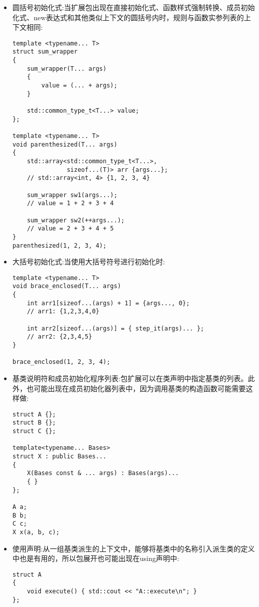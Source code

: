 \begin{itemize}
\item
圆括号初始化式:当扩展包出现在直接初始化式、函数样式强制转换、成员初始化式、new表达式和其他类似上下文的圆括号内时，规则与函数实参列表的上下文相同:

\begin{lstlisting}[style=styleCXX]
template <typename... T>
struct sum_wrapper
{
	sum_wrapper(T... args)
	{
		value = (... + args);
	}

	std::common_type_t<T...> value;
};

template <typename... T>
void parenthesized(T... args)
{
	std::array<std::common_type_t<T...>,
	           sizeof...(T)> arr {args...};
	// std::array<int, 4> {1, 2, 3, 4}
	
	sum_wrapper sw1(args...);
	// value = 1 + 2 + 3 + 4
	
	sum_wrapper sw2(++args...);
	// value = 2 + 3 + 4 + 5
}
parenthesized(1, 2, 3, 4);
\end{lstlisting}

\item
大括号初始化式:当使用大括号符号进行初始化时:

\begin{lstlisting}[style=styleCXX]
template <typename... T>
void brace_enclosed(T... args)
{
	int arr1[sizeof...(args) + 1] = {args..., 0};
	// arr1: {1,2,3,4,0}
	
	int arr2[sizeof...(args)] = { step_it(args)... };
	// arr2: {2,3,4,5}
}

brace_enclosed(1, 2, 3, 4);
\end{lstlisting}

\item
基类说明符和成员初始化程序列表:包扩展可以在类声明中指定基类的列表。此外，也可能出现在成员初始化器列表中，因为调用基类的构造函数可能需要这样做:

\begin{lstlisting}[style=styleCXX]
struct A {};
struct B {};
struct C {};

template<typename... Bases>
struct X : public Bases...
{
	X(Bases const & ... args) : Bases(args)...
	{ }
};

A a;
B b;
C c;
X x(a, b, c);
\end{lstlisting}

\item
使用声明:从一组基类派生的上下文中，能够将基类中的名称引入派生类的定义中也是有用的，所以包展开也可能出现在using声明中:

\begin{lstlisting}[style=styleCXX]
struct A
{
	void execute() { std::cout << "A::execute\n"; }
};


\end{lstlisting}
\end{itemize}
